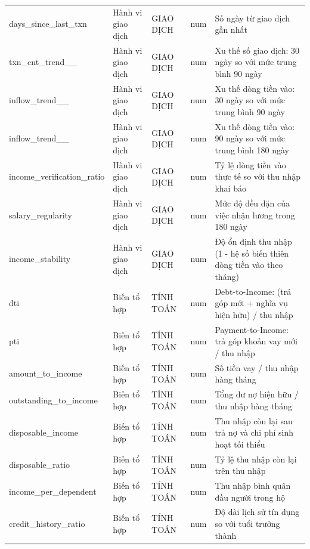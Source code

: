 \begin{longtable}{@{}L{3.761cm}L{2.121cm}L{2.314cm}L{1.061cm}L{4.918cm}@{}}
days\_\allowbreak since\_\allowbreak last\_\allowbreak txn & Hành vi giao dịch & GIAO DỊCH & num & Số ngày từ giao dịch gần nhất \\
txn\_\allowbreak cnt\_\allowbreak trend\_\_ & Hành vi giao dịch & GIAO DỊCH & num & Xu thế số giao dịch: 30 ngày so với mức trung bình 90 ngày \\
inflow\_\allowbreak trend\_\_ & Hành vi giao dịch & GIAO DỊCH & num & Xu thế dòng tiền vào: 30 ngày so với mức trung bình 90 ngày \\
inflow\_\allowbreak trend\_\_ & Hành vi giao dịch & GIAO DỊCH & num & Xu thế dòng tiền vào: 90 ngày so với mức trung bình 180 ngày \\
income\_\allowbreak verification\_\allowbreak ratio & Hành vi giao dịch & GIAO DỊCH & num & Tỷ lệ dòng tiền vào thực tế so với thu nhập khai báo \\
salary\_\allowbreak regularity & Hành vi giao dịch & GIAO DỊCH & num & Mức độ đều đặn của việc nhận lương trong 180 ngày \\
income\_\allowbreak stability & Hành vi giao dịch & GIAO DỊCH & num & Độ ổn định thu nhập (1 - hệ số biến thiên dòng tiền vào theo tháng) \\
dti & Biến tổ hợp & TÍNH TOÁN & num & Debt-\allowbreak to-\allowbreak Income: (trả góp mới + nghĩa vụ hiện hữu) / thu nhập \\
pti & Biến tổ hợp & TÍNH TOÁN & num & Payment-\allowbreak to-\allowbreak Income: trả góp khoản vay mới / thu nhập \\
amount\_\allowbreak to\_\allowbreak income & Biến tổ hợp & TÍNH TOÁN & num & Số tiền vay / thu nhập hàng tháng \\
outstanding\_\allowbreak to\_\allowbreak income & Biến tổ hợp & TÍNH TOÁN & num & Tổng dư nợ hiện hữu / thu nhập hàng tháng \\
disposable\_\allowbreak income & Biến tổ hợp & TÍNH TOÁN & num & Thu nhập còn lại sau trả nợ và chi phí sinh hoạt tối thiểu \\
disposable\_\allowbreak ratio & Biến tổ hợp & TÍNH TOÁN & num & Tỷ lệ thu nhập còn lại trên thu nhập \\
income\_\allowbreak per\_\allowbreak dependent & Biến tổ hợp & TÍNH TOÁN & num & Thu nhập bình quân đầu người trong hộ \\
credit\_\allowbreak history\_\allowbreak ratio & Biến tổ hợp & TÍNH TOÁN & num & Độ dài lịch sử tín dụng so với tuổi trưởng thành \\

\end{longtable}
